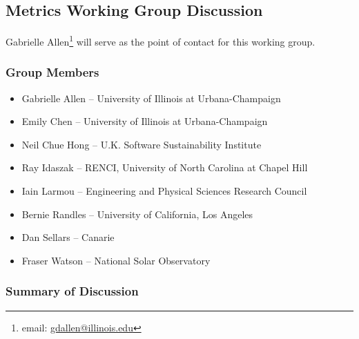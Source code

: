 \subsection{Metrics Working Group Discussion}
\label{sec:appendix_metrics}

Gabrielle Allen\footnote{email: \href{mailto:gdallen@illinois.edu}{gdallen@illinois.edu}} 
will serve as the point of contact for this working group.


\subsubsection{Group Members}

\begin{itemize}
\item Gabrielle Allen -- University of Illinois at Urbana-Champaign
\item Emily Chen -- University of Illinois at Urbana-Champaign
\item Neil Chue Hong -- U.K. Software Sustainability Institute
\item Ray Idaszak -- RENCI, University of North Carolina at Chapel Hill
\item Iain Larmou -- Engineering and Physical Sciences Research Council
\item Bernie Randles -- University of California, Los Angeles
\item Dan Sellars -- Canarie
\item Fraser Watson -- National Solar Observatory
\end{itemize}

\subsubsection{Summary of Discussion}


